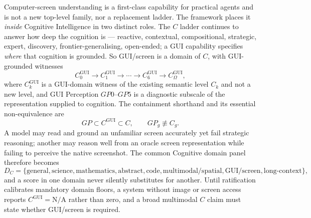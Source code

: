 \documentclass[11pt]{article}
\theoremstyle{definition}
\begin{document}
Computer-screen understanding is a first-class capability for practical agents and is not a new top-level family, nor a replacement ladder. The framework places it \emph{inside} Cognitive Intelligence in two distinct roles. The $C$ ladder continues to answer how deep the cognition is --- reactive, contextual, compositional, strategic, expert, discovery, frontier-generalising, open-ended; a GUI capability specifies \emph{where} that cognition is grounded. So GUI/screen is a domain of $C$, with GUI-grounded witnesses
\[
C^{\mathrm{GUI}}_0 \to C^{\mathrm{GUI}}_1 \to \cdots \to C^{\mathrm{GUI}}_6 \to C^{\mathrm{GUI}}_{\Omega},
\]
where $C^{\mathrm{GUI}}_k$ is a GUI-domain witness of the existing semantic level $C_k$ and not a new level, and GUI Perception $GP0$--$GP5$ is a diagnostic subscale of the representation supplied to cognition. The containment shorthand and its essential non-equivalence are
\[
GP \subset C^{\mathrm{GUI}} \subset C, \qquad GP_g \not\equiv C_g .
\]
A model may read and ground an unfamiliar screen accurately yet fail strategic reasoning; another may reason well from an oracle screen representation while failing to perceive the native screenshot. The common Cognitive domain panel therefore becomes
\[
D_C = \{\text{general}, \text{science}, \text{mathematics}, \text{abstract}, \text{code}, \text{multimodal/spatial}, \text{GUI/screen}, \text{long-context}\},
\]
and a score in one domain never silently substitutes for another. Until ratification calibrates mandatory domain floors, a system without image or screen access reports $C^{\mathrm{GUI}} = \text{N/A}$ rather than zero, and a broad multimodal $C$ claim must state whether GUI/screen is required.
\end{document}
